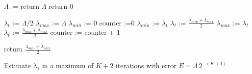 \begin{algorithm}
    \begin{algorithmic}[1]
    
    \State $\Lambda$ := 
                \State return $\Lambda$
    \EndIf
        \State return 0
    \EndIf
    
    \State
    \State $\lambda_t$ := $\Lambda / 2$
    \State $\lambda_{max}$ := $\Lambda$
    \State $\lambda_{min}$ := 0
    \State counter :=0    
        \State $\lambda_{min}$ := $\lambda_t$
        \State $\lambda_t$ := $\frac{\lambda_{min} + \lambda_{max}}{2}$
        \Else
            \State $\lambda_{max}$ := $\lambda_t$
            \State $\lambda_{t}$ := $\frac{\lambda_{min} + \lambda_{max}}{2}$
        \EndIf
        \State counter := counter + 1
    \EndWhile 
    

    \State return $\frac{\lambda_{min} + \lambda_{max}}{2}$
    \EndProcedure
    \end{algorithmic}
    \caption{Estimate $\lambda_{1}$ in a maximum of $K+2$ iterations with error $E = \Lambda \, 2^{-(K+1)}$ }
\label{alg:actual-capacity}
\end{algorithm}

